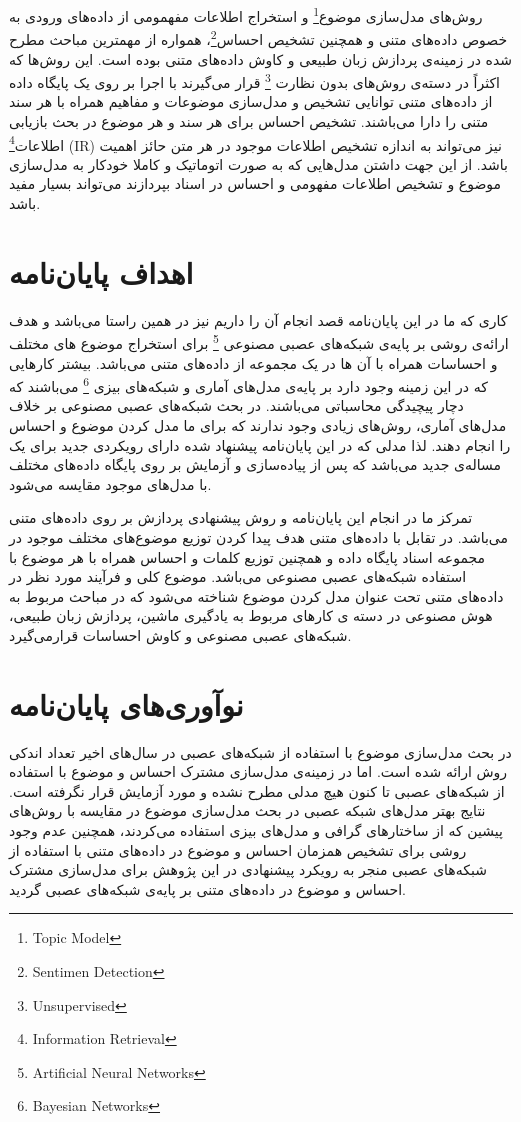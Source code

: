  		روش‌های مدل‌سازی موضوع\footnote{Topic Model}
 		و استخراج اطلاعات مفهمومی از داده‌های ورودی به خصوص داده‌های متنی و همچنین تشخیص احساس\footnote{Sentimen Detection}،
 		 همواره از مهمترین مباحث مطرح شده در زمینه‌ی پردازش زبان طبیعی و کاوش داده‌های متنی بوده است. این روش‌ها که اکثراً در دسته‌ی روش‌های بدون نظارت \footnote{Unsupervised}
 		 قرار می‌‌گیرند با اجرا بر روی یک پایگاه داده‌ از داده‌های متنی توانایی تشخیص و مدل‌سازی موضوعات و مفاهیم همراه با هر سند متنی را دارا می‌‌باشند. تشخیص احساس برای هر سند و هر موضوع در بحث بازیابی اطلاعات\footnote{Information Retrieval}
 (IR)
 		 نیز می‌‌تواند به اندازه تشخیص اطلاعات موجود در هر متن حائز اهمیت باشد. از این جهت داشتن مدل‌هایی که به صورت اتوماتیک و کاملا خودکار به مدل‌سازی موضوع و تشخیص اطلاعات مفهومی‌ و احساس در اسناد بپردازند می‌تواند بسیار مفید باشد.
 		
\section{اهداف پایان‌نامه}
کاری که ما در این پایان‌‌نامه قصد انجام آن را داریم نیز در همین راستا می‌‌باشد و هدف ارائه‌ی روشی‌ بر پایه‌ی شبکه‌های عصبی مصنوعی \footnote{Artificial Neural Networks}
برای استخراج موضوع های مختلف و احساسا‌ت همراه  با آن ها در یک مجموعه از داده‌های متنی می‌‌باشد. بیشتر کارهایی که در این زمینه وجود دارد بر پایه‌ی مدل‌های آماری و شبکه‌های بیزی \footnote{Bayesian Networks}
می‌‌باشند که دچار پیچیدگی محاسباتی می‌‌باشند. در بحث شبکه‌های عصبی مصنوعی بر خلاف مدل‌های آماری، روش‌های زیادی وجود ندارند که برای ما مدل کردن موضوع و احساس را انجام دهند. لذا مدلی‌ که در این پایان‌‌نامه پیشنهاد شده دارای رویکردی جدید برای یک مساله‌ی جدید می‌باشد که پس از پیاده‌سازی و آزمایش بر روی پایگاه داده‌های مختلف با مدل‌های موجود مقایسه می‌‌شود.


تمرکز ما در انجام این پایان‌‌نامه و روش پیشنهادی پردازش بر روی داده‌های متنی می‌‌باشد. در تقابل با داده‌های متنی هدف پیدا کردن توزیع موضوع‌های مختلف موجود در مجموعه اسناد پایگاه داده و همچنین توزیع کلمات و احساس همراه با هر موضوع با استفاده شبکه‌های عصبی مصنوعی می‌‌باشد. موضوع کلی و فرآیند مورد نظر در داده‌های متنی تحت عنوان مدل کردن موضوع شناخته می‌‌شود که در مباحث مربوط به هوش مصنوعی در دسته ی کارهای مربوط به یادگیری ماشین، پردازش زبان طبیعی، شبکه‌های عصبی مصنوعی و کاوش احساسات قرارمی‌‌گیرد.

\section{نوآوری‌های پایان‌نامه}
در بحث مدل‌سازی موضوع با استفاده از شبکه‌های عصبی در سال‌های اخیر تعداد اندکی‌ روش ارائه شده است. اما در زمینه‌‌ی مدل‌سازی مشترک احساس و موضوع با استفاده از شبکه‌های عصبی تا کنون هیچ مدلی‌ مطرح نشده و مورد آزمایش قرار نگرفته است. نتایج بهتر مدل‌های شبکه عصبی در بحث مدل‌سازی موضوع در مقایسه با روش‌های پیشین که از ساختارهای گرافی‌ و مدل‌های بیزی استفاده می‌‌کردند، همچنین عدم وجود روشی‌ برای تشخیص همزمان احساس و موضوع در داده‌های متنی با استفاده از شبکه‌های عصبی منجر به رویکرد پیشنهادی در این پژوهش برای مدل‌سازی مشترک احساس و موضوع در داده‌های متنی بر پایه‌ی شبکه‌های عصبی گردید.

